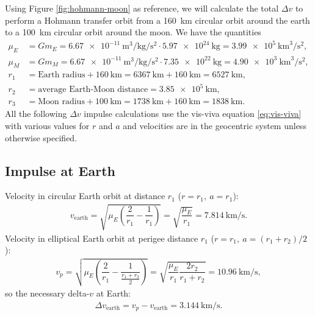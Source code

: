 Using Figure \ref{fig:hohmann-moon} as reference, we will calculate the total $\Delta v$ to perform a Hohmann transfer orbit from a \SI{160}{\km} circular orbit around the earth to a \SI{100}{\km} circular orbit around the moon. We have the quantities \cite{ma}
\begin{align}
\mu_E &= G m_E = \SI[per-mode=fraction]{6.67e-11}{\m\cubed\per\kg\per\s\squared} \cdot \SI{5.97e24}{\kg} = \SI{3.99e5}{\km\cubed\per\s\squared}, \\[0.2cm]
\mu_M &= G m_M = \SI[per-mode=fraction]{6.67e-11}{\m\cubed\per\kg\per\s\squared} \cdot \SI{7.35e22}{\kg} = \SI{4.90e3}{\km\cubed\per\s\squared}, \\[0.2cm]
r_1 &= \text{Earth radius} + \SI{160}{\km} = \SI{6367}{\km}+ \SI{160}{\km} = \SI{6527}{\km}, \\[0.2cm]
r_2 &= \text{average Earth-Moon distance} = \SI{3.85e5}{\km}, \\[0.2cm]
r_3 &= \text{Moon radius} + \SI{100}{\km} = \SI{1738}{\km}+ \SI{160}{\km} = \SI{1838}{\km}.
\end{align}
All the following $\Delta v$ impulse calculations use the vis-viva equation \eqref{eq:vis-viva} with various values for $r$ and $a$ and velocities are in the geocentric system unless otherwise specified.

\subsection{Impulse at Earth}
Velocity in circular Earth orbit at distance $r_1$ ($r = r_1,\ a = r_1$):
\begin{align}
v_{\text{earth}} = \sqrt{\mu_E\left(\dfrac{2}{r_1} - \dfrac{1}{r_1}\right)} = \sqrt{\dfrac{\mu_E}{r_1}} = \SI{7.814}{\km\per\s}. \label{eq:v-earth}
\end{align}
Velocity in elliptical Earth orbit at perigee distance $r_1$ ($r = r_1,\ a = (r_1+r_2)/2$):
\begin{align}
v_p = \sqrt{\mu_E\left(\dfrac{2}{r_1} - \dfrac{1}{\frac{r_1+r_2}{2}}\right)} = \sqrt{\dfrac{\mu_E}{r_1} \dfrac{2 r_2}{r_1+r_2}} = \SI{10.96}{\km\per\s}, \label{eq:vp}
\end{align}
so the necessary delta-$v$ at Earth:
\begin{align}
\Delta v_{\text{earth}} = v_p - v_{\text{earth}} = \SI{3.144}{\km\per\s}. \label{eq:deltav-earth}
\end{align}

